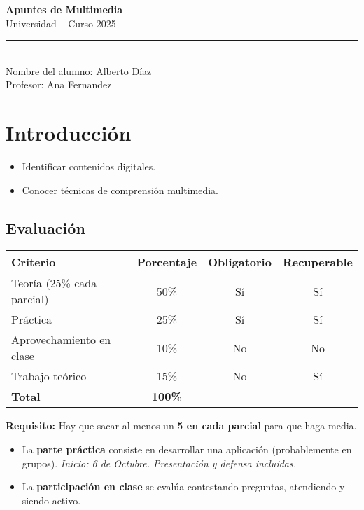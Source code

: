 \documentclass[11pt,a4paper]{article}
\begin{document}
	
	\begin{center}
		{\huge \textbf{Apuntes de Multimedia}} \\[0.5cm]
		{\Large Universidad \;--\; Curso 2025} \\[0.3cm]
		\rule{0.8\linewidth}{0.5pt} \\[0.3cm]
		{\faUser\; Nombre del alumno: Alberto Díaz} \\[0.2cm]
		{\faChalkboardTeacher\; Profesor: Ana Fernandez} \\[1.2cm]
	\end{center}
	
	\section*{Introducción}
	
	\begin{ObjetivosBox}
		\begin{itemize}[leftmargin=1.5em]
			\item Identificar contenidos digitales.
			\item Conocer técnicas de comprensión multimedia.
		\end{itemize}
	\end{ObjetivosBox}
	
	\subsection*{Evaluación}
	
	\begin{center}
		\renewcommand{\arraystretch}{1.4} %
		\begin{tabular}{|l|c|c|c|}
			\hline
			\textbf{Criterio} & \textbf{Porcentaje} & \textbf{Obligatorio} & \textbf{Recuperable} \\
			\hline
			Teoría (25\% cada parcial) & 50\% & Sí & Sí \\
			Práctica & 25\% & Sí & Sí \\
			Aprovechamiento en clase & 10\% & No & No \\
			Trabajo teórico & 15\% & No & Sí \\
			\hline
			\textbf{Total} & \textbf{100\%} & & \\
			\hline
		\end{tabular}
	\end{center}
	
	\begin{NotaBox}
		\textbf{Requisito:} Hay que sacar al menos un \textbf{5 en cada parcial} para que haga media.
	\end{NotaBox}
	
	\begin{RecordatorioBox}
		\begin{itemize}
			\item La \textbf{parte práctica} consiste en desarrollar una aplicación (probablemente en grupos).  
			\textit{Inicio: 6 de Octubre. Presentación y defensa incluidas.}
			\item La \textbf{participación en clase} se evalúa contestando preguntas, atendiendo y siendo activo.
		\end{itemize}
	\end{RecordatorioBox}
	
\end{document}
